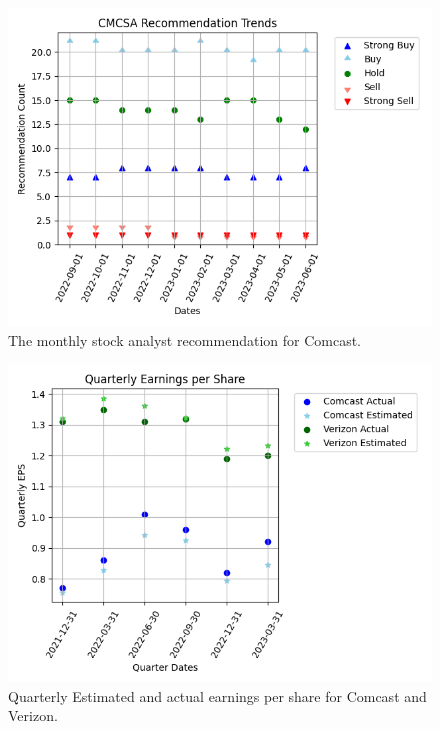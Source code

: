 \documentclass[conference]{IEEEtran}
\begin{document}
\begin{figure}
    \includegraphics[width=\columnwidth]{trends}
    \caption{The monthly stock analyst recommendation for Comcast.}
\end{figure}

\begin{figure}
    \includegraphics[width=\columnwidth]{earnings}
    \caption{Quarterly Estimated and actual earnings per share for Comcast and Verizon.}
\end{figure}
\end{document}
